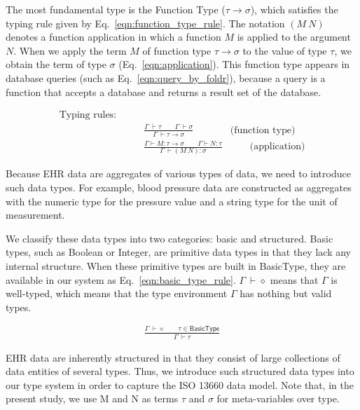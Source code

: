 \documentclass[preprint,3p,onecolumn,times,review]{elsarticle}
\begin{document}
The most fundamental type is the Function Type ($\tau \rightarrow \sigma$), which satisfies the typing rule given by Eq.~\ref{eqn:function_type_rule}.
The notation $(M~N)$ denotes a function application in which a function $M$ is applied to the argument $N$.
When we apply the term $M$ of function type $\tau \rightarrow \sigma$ to the value of type $\tau$, we obtain the term of type $\sigma$ (Eq.~\ref{eqn:application}).
This function type appears in database queries (such as Eq.~\ref{eqn:query_by_foldr}), because a query is a function that accepts a database and returns a result set of the database.


  \begin{align}
        \text{Typing rules:} \qquad   \nonumber\\
    & \frac{\Gamma~ \vdash \tau \qquad \Gamma~ \vdash \sigma}
           {\Gamma~ \vdash \tau \rightarrow \sigma}  & \label{eqn:function_type_rule} \text{(function type)}\\[6pt]
    & \frac{\Gamma \vdash M:\tau \rightarrow \sigma \qquad  \Gamma \vdash N:\tau}
           {\Gamma ~ \vdash (M~N):\sigma} & \qquad \text{(application)} \label{eqn:application}
  \end{align}


Because EHR data are aggregates of various types of data, we need to introduce such data types.
For example, blood pressure data are constructed as aggregates with the numeric type for the pressure value and a string type for the unit of measurement.

We classify these data types into two categories: basic and structured.
Basic types, such as Boolean or Integer,  are primitive data types in that they lack any internal structure.
When these primitive types are built in BasicType, they are available in our system as Eq.~\ref{eqn:basic_type_rule}.
$\Gamma~ \vdash \diamond$ means that $\Gamma$ is well-typed, which means that the type environment $\Gamma$ has nothing but valid types.
  
\begin{figure}[!htbp]
  \begin{align}
    \frac{\Gamma~ \vdash \diamond \qquad \tau \in \mathsf{BasicType}}
    {\Gamma~ \vdash \tau} \label{eqn:basic_type_rule}
  \end{align}
\end{figure}

EHR data are inherently structured in that they consist of large collections of data entities of several types.
Thus, we introduce such structured data types into our type system in order to capture the ISO 13660 data model. Note that, in the present study, we use M and N as terms $\tau$ and $\sigma$ for meta-variables over type.
  
\end{document}
